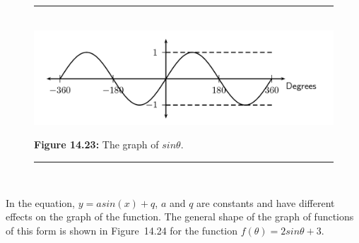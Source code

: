 \begin{figure}[H] %
\begin{center}
\rule[.1in]{\figurerulewidth}{.005in} \\
\label{m39414*uid31!!!underscore!!!media}\label{m39414*uid31!!!underscore!!!printimage}\includegraphics{col11306.imgs/m39414_MG10C15_017.png} %
\vspace{2pt}
\vspace{\rubberspace}\par \begin{cnxcaption}
\small \textbf{Figure 14.23: }The graph of $sin\theta $.
\end{cnxcaption}
\vspace{.1in}
\rule[.1in]{\figurerulewidth}{.005in} \\
\end{center}
\end{figure}       
\label{m39414*uid32}
\nopagebreak
\label{m39414*id84527}In the equation, $y=asin\left(x\right)+q$, $a$ and $q$ are constants and have different effects on the graph of the function. The general shape of the graph of functions of this form is shown in Figure~14.24 for the function $f\left(\theta \right)=2sin\theta +3$.\par 
\setcounter{subfigure}{0}
